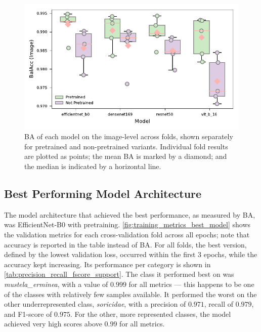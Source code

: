 \setlength{\fboxsep}{1pt}

\setlength{\fboxsep}{3pt}

\begin{figure}[ht]
\centering
\includegraphics{figures/bal_acc_img.pdf}
\caption{\acs{BA} of each model on the image-level across folds, shown separately for pretrained and non-pretrained variants. Individual fold results are plotted as points; the mean \acs{BA} is marked by a diamond; and the median is indicated by a horizontal line.}
\label{fig:bal_acc_img}
\end{figure}

\subsection{Best Performing Model Architecture}
The model architecture that achieved the best performance, as measured by \ac{BA}, was EfficientNet-B0 with pretraining. 
\autoref{fig:training_metrics_best_model} shows the validation metrics for each cross-validation fold across all epochs; note that accuracy is reported in the table instead of \ac{BA}.
For all folds, the best version, defined by the lowest validation loss, occurred within the first 3 epochs, while the accuracy kept increasing.
Its performance per category is shown in \autoref{tab:precision_recall_fscore_support}.
The class it performed best on was \textit{mustela\_erminea}, with a value of \(0.999\) for all metrics --- this happens to be one of the classes with relatively few samples available.
It performed the worst on the other underrepresented class, \textit{soricidae}, with a precision of \(0.971\), recall of \(0.979\), and F1-score of \(0.975\).
For the other, more represented classes, the model achieved very high scores above \(0.99\) for all metrics.

